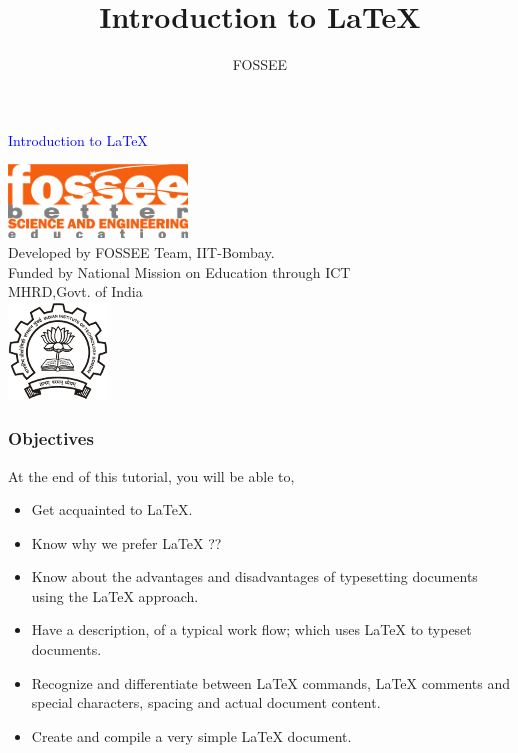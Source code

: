 \documentclass[12pt,compress]{beamer}
\title {Introduction to {\LaTeX}}
\author {FOSSEE}
\begin{document}
\begin{frame}

\begin{center}
\vspace{12pt}
\textcolor{blue}{\huge Introduction to {\LaTeX}}
\end{center}
\vspace{18pt}
\begin{center}
\vspace{10pt}
\includegraphics[scale=0.95]{../images/fossee-logo.png}\\
\vspace{5pt}
\scriptsize Developed by FOSSEE Team, IIT-Bombay. \\ 
\scriptsize Funded by National Mission on Education through ICT\\
\scriptsize  MHRD,Govt. of India\\
\includegraphics[scale=0.30]{../images/iitb-logo.png}\\
\end{center}
\end{frame}

\begin{frame}
\frametitle{Objectives}
\label{sec-2}

At the end of this tutorial, you will be able to,
\begin{itemize}
\item Get acquainted to LaTeX.
\item Know why we prefer LaTeX ??
\item Know about the advantages and disadvantages of typesetting documents using the LaTeX approach.
\item Have a description, of a typical work flow; which uses LaTeX to typeset documents.
\item Recognize and differentiate between LaTeX commands, LaTeX comments and special characters, spacing and actual document content.
\item Create and compile a very simple LaTeX document.
\end{itemize}
\end{frame}
\end{document}
